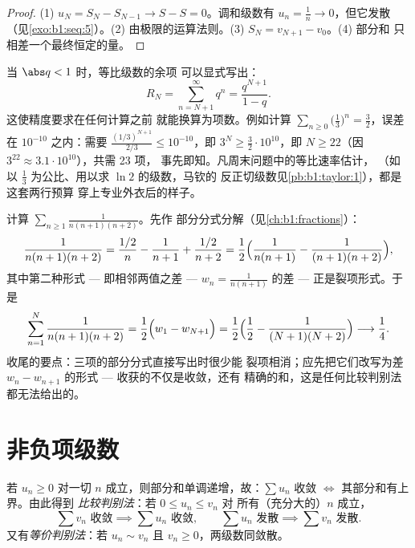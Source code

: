 \begin{proof}
(1) $u_N = S_N - S_{N-1} \to S - S = 0$。调和级数有
$u_n = \frac1n \to 0$，但它发散（见\cref{exo:b1:seq:5}）。(2)
由极限的运算法则。(3) $S_N = v_{N+1} - v_0$。(4) 部分和
只相差一个最终恒定的量。
\end{proof}

\begin{example}[用等比余项规划项数]\label{ex:b1:series:georemainder}
当 $\abs q < 1$ 时，等比级数的余项
可以显式写出：
\[
R_N = \sum_{n = N+1}^{\infty} q^n = \frac{q^{N+1}}{1 - q} .
\]
这使精度要求在任何计算之前
就能换算为项数。例如计算 $\sum_{n\geq0} \bigl(\frac13\bigr)^n =
\frac32$，误差在 $10^{-10}$ 之内：需要 $\frac{(1/3)^{N+1}}{2/3} \leq
10^{-10}$，即 $3^{N} \geq \frac{3}{2}\cdot 10^{10}$，即 $N
\geq 22$（因 $3^{22} \approx 3.1\cdot10^{10}$），共需 23 项，
事先即知。凡周末问题中的等比速率估计，
（如以 $\frac13$ 为公比、用以求 $\ln 2$ 的级数，马钦的
反正切级数见\cref{pb:b1:taylor:1}），都是这套两行预算
穿上专业外衣后的样子。
\end{example}

\begin{example}[更长的裂项]\label{ex:b1:series:telescope3}
计算 $\sum_{n\geq1} \frac{1}{n(n+1)(n+2)}$。先作
部分分式分解（见\cref{ch:b1:fractions}）：
\[
\frac{1}{n(n+1)(n+2)}
= \frac{1/2}{n} - \frac{1}{n+1} + \frac{1/2}{n+2}
= \frac12\Bigl(\frac{1}{n(n+1)} - \frac{1}{(n+1)(n+2)}\Bigr),
\]
其中第二种形式 --- 即相邻两值之差 ---
$w_n = \frac{1}{n(n+1)}$ 的差 --- 正是裂项形式。于是
\[
\sum_{n=1}^{N} \frac{1}{n(n+1)(n+2)}
= \frac12\Bigl(w_1 - w_{N+1}\Bigr)
= \frac12\Bigl(\frac12 - \frac{1}{(N+1)(N+2)}\Bigr)
\longrightarrow \frac14 .
\]
收尾的要点：三项的部分分式直接写出时很少能
裂项相消；应先把它们改写为差 $w_n -
w_{n+1}$ 的形式 --- 收获的不仅是收敛，还有
精确的和，这是任何比较判别法都无法给出的。
\end{example}

\section{非负项级数}

\begin{theorem}[部分和有界]\label{thm:b1:series:positive}
若 $u_n \geq 0$ 对一切 $n$ 成立，则部分和单调递增，故：$\sum
u_n$ 收敛 $\iff$ 其部分和有上界。由此得到
\emph{比较判别法}：若 $0 \leq u_n \leq v_n$ 对
所有（充分大的）$n$ 成立，
\[
\sum v_n \text{ 收敛} \implies \sum u_n \text{ 收敛},
\qquad
\sum u_n \text{ 发散} \implies \sum v_n \text{ 发散}.
\]
又有\emph{等价判别法}：若 $u_n \sim v_n$ 且 $v_n \geq
0$，两级数同敛散。
\end{theorem}

